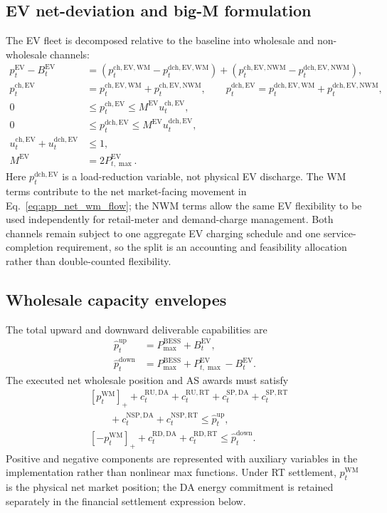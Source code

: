 \documentclass[final,5p,times]{elsarticle}
\newcommand{\EV}{\mathrm{EV}}
\newcommand{\BESS}{\mathrm{BESS}}
\newcommand{\DA}{\mathrm{DA}}
\newcommand{\RT}{\mathrm{RT}}
\newcommand{\RU}{\mathrm{RU}}
\newcommand{\RD}{\mathrm{RD}}
\newcommand{\SP}{\mathrm{SP}}
\newcommand{\NSP}{\mathrm{NSP}}
\newcommand{\WM}{\mathrm{WM}}
\newcommand{\NWM}{\mathrm{NWM}}
\newcommand{\ch}{\mathrm{ch}}
\newcommand{\dch}{\mathrm{dch}}
\newcommand{\up}{\mathrm{up}}
\newcommand{\down}{\mathrm{down}}
\newcommand{\pos}[1]{\left[#1\right]_+}
\begin{document}
\subsection{EV net-deviation and big-M formulation}
The EV fleet is decomposed relative to the baseline into wholesale and non-wholesale channels:
\begin{align}
p_t^{\EV}-B_t^{\EV}
&=\left(p_t^{\ch,\EV,\WM}-p_t^{\dch,\EV,\WM}\right)
+\left(p_t^{\ch,\EV,\NWM}-p_t^{\dch,\EV,\NWM}\right),\label{eq:app_ev_deviation}\\
p_t^{\ch,\EV}&=p_t^{\ch,\EV,\WM}+p_t^{\ch,\EV,\NWM},\qquad
p_t^{\dch,\EV}=p_t^{\dch,\EV,\WM}+p_t^{\dch,\EV,\NWM},\label{eq:app_ev_channel_split}\\
0&\le p_t^{\ch,\EV}\le M^{\EV}u_t^{\ch,\EV},\label{eq:app_ev_ch}\\
0&\le p_t^{\dch,\EV}\le M^{\EV}u_t^{\dch,\EV},\label{eq:app_ev_dch}\\
u_t^{\ch,\EV}+u_t^{\dch,\EV}&\le 1,\label{eq:app_ev_dir}\\
M^{\EV}&=2P_{t,\max}^{\EV}.\label{eq:app_ev_bigM}
\end{align}
Here $p_t^{\dch,\EV}$ is a load-reduction variable, not physical EV discharge. The WM terms contribute to the net market-facing movement in Eq.~\eqref{eq:app_net_wm_flow}; the NWM terms allow the same EV flexibility to be used independently for retail-meter and demand-charge management. Both channels remain subject to one aggregate EV charging schedule and one service-completion requirement, so the split is an accounting and feasibility allocation rather than double-counted flexibility.

\subsection{Wholesale capacity envelopes}
The total upward and downward deliverable capabilities are
\begin{align}
\hat p_t^{\up}&=P_{\max}^{\BESS}+B_t^{\EV},\label{eq:app_upcap}\\
\hat p_t^{\down}&=P_{\max}^{\BESS}+P_{t,\max}^{\EV}-B_t^{\EV}.\label{eq:app_downcap}
\end{align}
The executed net wholesale position and AS awards must satisfy
\begin{align}
&\pos{p_t^{\WM}}
+c_t^{\RU,\DA}+c_t^{\RU,\RT}
+c_t^{\SP,\DA}+c_t^{\SP,\RT}\nonumber\\
&\qquad +c_t^{\NSP,\DA}+c_t^{\NSP,\RT}
\le \hat p_t^{\up},\label{eq:app_upenv}\\
&\pos{-p_t^{\WM}}
+c_t^{\RD,\DA}+c_t^{\RD,\RT}
\le \hat p_t^{\down}.\label{eq:app_downenv}
\end{align}
Positive and negative components are represented with auxiliary variables in the implementation rather than nonlinear max functions. Under RT settlement, $p_t^{\WM}$ is the physical net market position; the DA energy commitment is retained separately in the financial settlement expression below.
\end{document}

